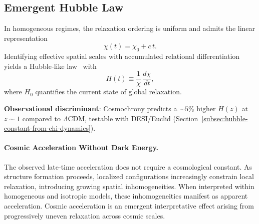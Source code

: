 \subsection{Emergent Hubble Law}
  \label{subsec:emergent-hubble-law}

  In homogeneous regimes, the relaxation ordering is uniform and admits the
  linear representation
  \begin{equation}
    \chi(t) = \chi_0 + c\, t .
    \label{eq:hubble-like}
  \end{equation}
  Identifying effective spatial scales with accumulated relational
  differentiation yields a Hubble-like
  law~\cite{Hubble1929,Hogg1999} with
  \begin{equation}
    H(t) \equiv \frac{1}{\chi}\,\frac{d\chi}{dt},
    \label{eq:hubble-like}
  \end{equation}
  where $H_0$ quantifies the current state of global relaxation.

  \textbf{Observational discriminant}: Cosmochrony predicts a $\sim 5\%$
  higher $H(z)$ at $z\sim 1$ compared to $\Lambda$CDM, testable with
  DESI/Euclid
  (Section~\ref{subsec:hubble-constant-from-chi-dynamics}).

  \paragraph{Cosmic Acceleration Without Dark Energy.}
    \label{par:acceleration-without-dark-energy}
    The observed late-time acceleration does not require a cosmological
    constant.
    As structure formation proceeds, localized configurations increasingly
    constrain local relaxation, introducing growing spatial inhomogeneities.
    When interpreted within homogeneous and isotropic models, these
    inhomogeneities manifest as apparent acceleration.
    Cosmic acceleration is an emergent interpretative effect arising from
    progressively uneven relaxation across cosmic scales.
